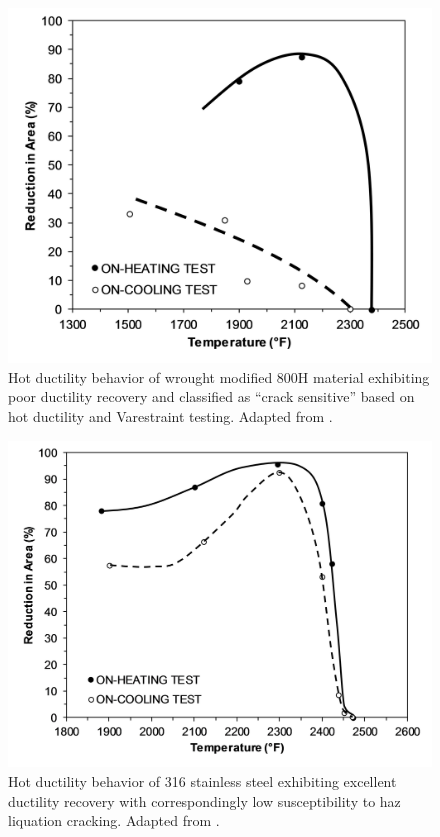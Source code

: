 {\begin{figure}
    \centering
    \includegraphics{figures/qiao-hot-ductility-800h-susceptible-r1.png}
    \caption{Hot ductility behavior of wrought modified 800H material exhibiting poor ductility recovery and classified as ``crack sensitive'' based on hot ductility and Varestraint testing. Adapted from \citet{qiao_weldability_1993}.}
    \label{fig:qiao-hot-ductility-800h-susceptible}
\end{figure}

\begin{figure}
    \centering
    \includegraphics{figures/qiao-hot-ductility-ref-316-r1.png}
    \caption{Hot ductility behavior of 316 stainless steel exhibiting excellent ductility recovery with correspondingly low susceptibility to \gls{haz} liquation cracking. Adapted from \citet{qiao_weldability_1993}.}
    \label{fig:qiao-hot-ductility-316}
\end{figure}

}
